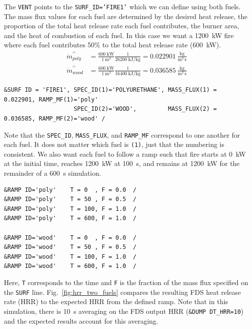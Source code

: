 \documentclass[11pt]{book}
\newcommand{\ct}{\tt\small}
\begin{document}
The {\ct VENT} points to the {\ct SURF\_ID='FIRE1'} which we can define using both fuels. The mass flux values for each fuel are determined by the desired heat release, the proportion of the total heat release rate each fuel contributes, the burner area, and the heat of combustion of each fuel. In this case we want a 1200~kW fire where each fuel contributes 50\% to the total heat release rate (600~kW).
\begin{align}
\dot{m}^{\prime \prime}_{poly} &= \frac{600~\mathrm{kW}}{1~\mathrm{m^2}}\frac{1}{26200~\mathrm{kJ/kg}} = 0.022901~\mathrm{\frac{kg}{m^2\,s}}\\
\dot{m}^{\prime \prime}_{wood} &= \frac{600~\mathrm{kW}}{1~\mathrm{m^2}}\frac{1}{16400~\mathrm{kJ/kg}} = 0.036585~\mathrm{\frac{kg}{m^2\,s}}
\end{align}

\footnotesize \begin{verbatim}
&SURF ID = 'FIRE1', SPEC_ID(1)='POLYURETHANE', MASS_FLUX(1) = 0.022901, RAMP_MF(1)='poly'
                    SPEC_ID(2)='WOOD',         MASS_FLUX(2) = 0.036585, RAMP_MF(2)='wood' /
\end{verbatim} \normalsize
Note that the {\ct SPEC\_ID}, {\ct MASS\_FLUX}, and {\ct RAMP\_MF} correspond to one another for each fuel. It does not matter which fuel is {\ct (1)}, just that the numbering is consistent. We also want each fuel to follow a ramp such that fire starts at 0~kW at the initial time, reaches 1200~kW at 100~s, and remains at 1200~kW for the remainder of a 600~s simulation.
\footnotesize \begin{verbatim}
&RAMP ID='poly'    T = 0  , F = 0.0  /
&RAMP ID='poly'    T = 50 , F = 0.5  /
&RAMP ID='poly'    T = 100, F = 1.0  /
&RAMP ID='poly'    T = 600, F = 1.0  /

&RAMP ID='wood'    T = 0  , F = 0.0  /
&RAMP ID='wood'    T = 50 , F = 0.5  /
&RAMP ID='wood'    T = 100, F = 1.0  /
&RAMP ID='wood'    T = 600, F = 1.0  /
\end{verbatim} \normalsize
Here, {\ct T} corresponds to the time and {\ct F} is the fraction of the mass flux specified on the {\ct SURF} line. Fig.~\ref{fig:hrr_two_fuels} compares the resulting FDS heat release rate (HRR) to the expected HRR from the defined ramp. Note that in this simulation, there is 10~s averaging on the FDS output HRR ({\ct \&DUMP DT\_HRR=10}) and the expected results account for this averaging.
\end{document}
